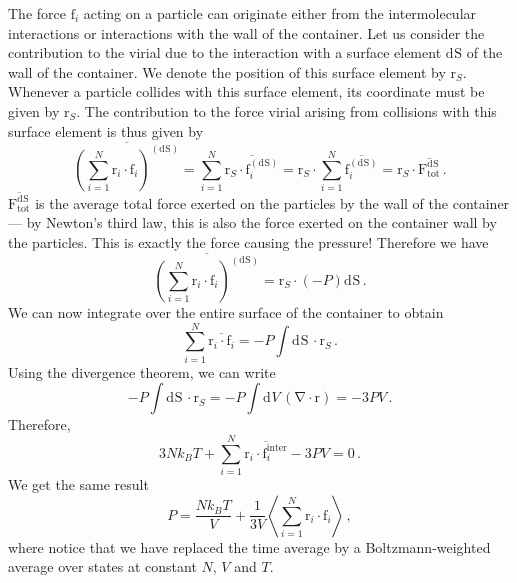 \documentclass{article}
\theoremstyle{plain}\theoremheaderfont{\normalfont\bfseries}\theorembodyfont{\rmfamily}\theoremseparator{.}\newtheorem*{thm}{Theorem}\newtheorem*{law}{Law}\newtheorem*{pos}{Postulate}
\numberwithin{equation}{section}
\newcommand{\dd}[2][]{\mathrm{d}^{#1} #2\,}
\renewcommand{\d}[2][]{\mathrm{d}^{#1} #2}
\newcommand{\eval}[1]{\left\langle #1 \right\rangle}
\newcommand{\vb}[1]{\bm{\mathrm{#1}}}
\newcommand{\vdot}{\,\bm{\mathrm{\cdot}}\,}
\renewcommand{\div}{\vb{\nabla}\cdot}
\begin{document}
    The force \(\vb{f}_i\) acting on a particle can originate either from the intermolecular interactions or interactions with the wall of the container. Let us consider the contribution to the virial due to the interaction with a surface element \(\d{\vb{S}}\) of the wall of the container. We denote the position of this surface element by \(\vb{r}_S\). Whenever a particle collides with this surface element, its coordinate must be given by \(\vb{r}_S\). The contribution to the force virial arising from collisions with this surface element is thus given by
    \begin{equation}
        \overline{\left(\sum_{i=1}^{N}\vb{r}_i\vdot\vb{f}_i\right)^{(\d{\vb{S}})}}=\sum_{i=1}^{N}\overline{\vb{r}_S\vdot\vb{f}_i^{(\d{\vb{S}})}}=\vb{r}_S\vdot\sum_{i=1}^{N}\overline{\vb{f}_i^{(\d{\vb{S}})}}=\vb{r}_S\vdot\overline{\vb{F}_\text{tot}^{\d{\vb{S}}}}\,.
    \end{equation}
    \(\overline{\vb{F}_\text{tot}^{\d{\vb{S}}}}\) is the average total force exerted on the particles by the wall of the container --- by Newton's third law, this is also the force exerted on the container wall by the particles. This is exactly the force causing the pressure! Therefore we have
    \begin{equation}
        \overline{\left(\sum_{i=1}^{N}\vb{r}_i\vdot\vb{f}_i\right)^{(\d{\vb{S}})}}=\vb{r}_S\vdot(-P)\d{\vb{S}}\,.
    \end{equation}
    We can now integrate over the entire surface of the container to obtain
    \begin{equation}
        \sum_{i=1}^{N}\overline{\vb{r}_i\vdot\vb{f}_i}=-P\int\dd{\vb{S}}\vdot\vb{r}_S\,.
    \end{equation}
    Using the divergence theorem, we can write
    \begin{equation}
        -P\int\dd{\vb{S}}\vdot\vb{r}_S=-P\int\dd{V}(\div\vb{r})=-3PV\,.
    \end{equation}
    Therefore,
    \begin{equation}
        3Nk_B T+\sum_{i=1}^{N}\overline{\vb{r}_i\vdot\vb{f}_i^{\text{inter}}}-3PV=0\,.
    \end{equation}
    We get the same result
    \begin{equation}
        P=\frac{Nk_B T}{V}+\frac{1}{3V}\eval{\sum_{i=1}^{N}\vb{r}_i\vdot\vb{f}_i}\,,
    \end{equation}
    where notice that we have replaced the time average by a Boltzmann-weighted average over states at constant \(N\), \(V\) and \(T\).
\end{document}
